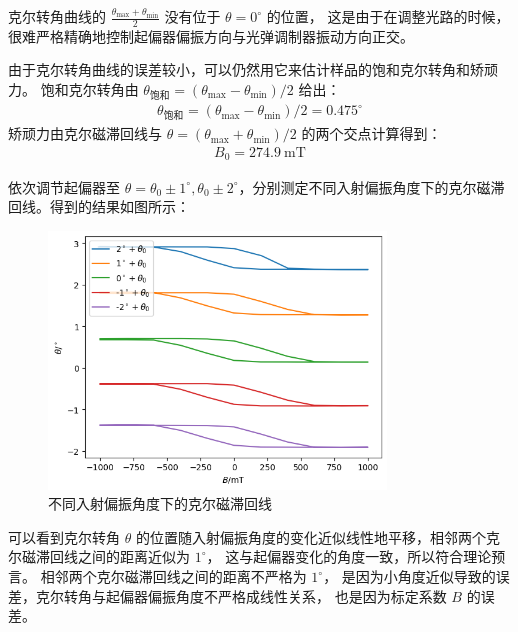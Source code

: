 \documentclass[revtex4-2]{mpltx}
\begin{document}
    克尔转角曲线的 $\frac{\theta_{\max}+\theta_{\min}}{2}$ 没有位于 $\theta=0^\circ$ 的位置，
    这是由于在调整光路的时候，很难严格精确地控制起偏器偏振方向与光弹调制器振动方向正交。

    由于克尔转角曲线的误差较小，可以仍然用它来估计样品的饱和克尔转角和矫顽力。
    饱和克尔转角由 $\theta_{\text{饱和}}=(\theta_{\max}-\theta_{\min})/2$ 给出：
    \begin{align*}
        \theta_{\text{饱和}}=(\theta_{\max}-\theta_{\min})/2
        =0.475^\circ
    \end{align*}
    矫顽力由克尔磁滞回线与 $\theta=(\theta_{\max}+\theta_{\min})/2$ 的两个交点计算得到：
    \begin{align*}
        B_0=274.9\ \text{mT}
    \end{align*}

    依次调节起偏器至 $\theta=\theta_0\pm 1^\circ,\theta_0\pm 2^\circ$，分别测定不同入射偏振角度下的克尔磁滞回线。得到的结果如图所示：
    \begin{figure}[htbp]
        \centering
        \includegraphics[width=0.8\textwidth]{./3.png}
        \caption{不同入射偏振角度下的克尔磁滞回线}\label{fig:3}
    \end{figure}
    
    可以看到克尔转角 $\theta$ 的位置随入射偏振角度的变化近似线性地平移，相邻两个克尔磁滞回线之间的距离近似为 $1^\circ$，
    这与起偏器变化的角度一致，所以符合理论预言。
    相邻两个克尔磁滞回线之间的距离不严格为 $1^\circ$，
    是因为小角度近似导致的误差，克尔转角与起偏器偏振角度不严格成线性关系，
    也是因为标定系数 $B$ 的误差。
\end{document}
